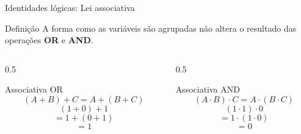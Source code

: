 
\begin{frame}{Identidades lógicas: Lei associativa}
    \begin{block}{Definição}
        A forma como as variáveis são agrupadas não altera o resultado
        das operações \textbf{OR} e \textbf{AND}.
    \end{block}
    \begin{columns}[T]

        \begin{column}{0.5\textwidth}
            \begin{block}{Associativa OR}
                \[
                    \boxed{(A + B) + C = A + (B + C)}
                \]
                \[
                    (1 + 0) + 1
                \]
                \[
                    = 1 + (0 + 1)
                \]
                \[
                    = 1
                \]
            \end{block}
        \end{column}

        \begin{column}{0.5\textwidth}
            \begin{block}{Associativa AND}
                \[
                    \boxed{(A \cdot B)\cdot C
                    = A\cdot(B\cdot C)}
                \]
                \[
                    (1 \cdot 1)\cdot 0
                \]
                \[
                    = 1\cdot(1\cdot0)
                \]
                \[
                    = 0
                \]
            \end{block}
        \end{column}

    \end{columns}
    
\end{frame}